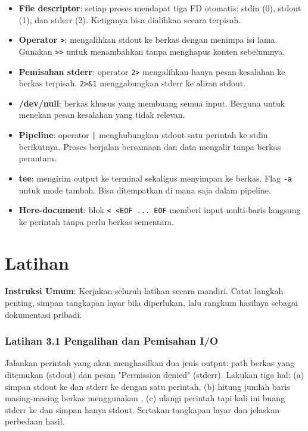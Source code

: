 \begin{itemize}[noitemsep,topsep=2pt]
    \item \textbf{File descriptor}: setiap proses mendapat tiga FD otomatis: stdin (0), stdout (1), dan stderr (2). Ketiganya bisa dialihkan secara terpisah.
    \item \textbf{Operator \texttt{>}}: mengalihkan stdout ke berkas dengan menimpa isi lama. Gunakan \texttt{>>} untuk menambahkan tanpa menghapus konten sebelumnya.
    \item \textbf{Pemisahan stderr}: operator \texttt{2>} mengalihkan hanya pesan kesalahan ke berkas terpisah. \texttt{2>\&1} menggabungkan stderr ke aliran stdout.
    \item \textbf{/dev/null}: berkas khusus yang membuang semua input. Berguna untuk menekan pesan kesalahan yang tidak relevan.
    \item \textbf{Pipeline}: operator \texttt{|} menghubungkan stdout satu perintah ke stdin berikutnya. Proses berjalan bersamaan dan data mengalir tanpa berkas perantara.
    \item \textbf{tee}: mengirim output ke terminal sekaligus menyimpan ke berkas. Flag \texttt{-a} untuk mode tambah. Bisa ditempatkan di mana saja dalam pipeline.
    \item \textbf{Here-document}: blok \texttt{<\,<EOF ... EOF} memberi input multi-baris langsung ke perintah tanpa perlu berkas sementara.
\end{itemize}

\section{Latihan}

\textbf{Instruksi Umum}: Kerjakan seluruh latihan secara mandiri. Catat langkah penting, simpan tangkapan layar bila diperlukan, lalu rangkum hasilnya sebagai dokumentasi pribadi.

\subsubsection*{Latihan 3.1 Pengalihan dan Pemisahan I/O}
Jalankan perintah  yang akan menghasilkan dua jenis output: path berkas yang ditemukan (stdout) dan pesan "Permission denied" (stderr). Lakukan tiga hal: (a) simpan stdout ke  dan stderr ke  dengan satu perintah, (b) hitung jumlah baris masing-masing berkas menggunakan , (c) ulangi perintah tapi kali ini buang stderr ke  dan simpan hanya stdout. Sertakan tangkapan layar dan jelaskan perbedaan hasil.


